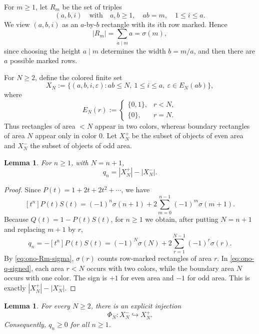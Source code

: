 \documentclass[11pt,reqno]{amsart}
\theoremstyle{plain}
\newtheorem{lemma}[theorem]{Lemma}
\theoremstyle{remark}
\theoremstyle{definition}
\numberwithin{equation}{section}
\newcommand{\auxftn}{P}
\newcommand{\auxprodftn}{Q}
\newcommand{\coefauxprod}{q}
\newcommand{\colorset}{E}
\newcommand{\rectangle}{R}
\begin{document}
For $m\ge1$, let $\rectangle _m$ be the set of triples
\[
  (a,b,i) \quad\text{with}\quad a,b\ge1,\quad ab=m,
  \quad 1\le i\le a.
\]
We view $(a,b,i)$ as an $a$-by-$b$ rectangle with its $i$th row marked. Hence
\begin{equation}\label{eq:ono-Rm-sigma}
  |\rectangle _m|=\sum_{a\mid m}a=\sigma(m),
\end{equation}
since choosing the height $a\mid m$ determines the width $b=m/a$, and then there are $a$ possible marked rows.

For $N\ge2$, define the colored finite set
\[
  X_N:=\{(a,b,i,\varepsilon): ab\le N,
      \ 1\le i\le a,
      \ \varepsilon\in \colorset _N(ab)\},
\]
where
\[
  \colorset _N(r):=
  \begin{cases}
    \{0,1\}, & r<N,\\
    \{0\},   & r=N.
  \end{cases}
\]
Thus rectangles of area $<N$ appear in two colors, whereas boundary rectangles of area $N$ appear only in color $0$. Let $X_N^+$ be the subset of objects of even area and $X_N^-$ the subset of objects of odd area.

\begin{lemma}\label{lem:ono-signedcount}
For $n\ge1$, with $N=n+1$,
\[
  \coefauxprod _n=|X_N^+|-|X_N^-|.
\]
\end{lemma}

\begin{proof}
Since $\auxftn (t)=1+2t+2t^2+\cdots$, we have
\[
  [t^n]\auxftn (t)S(t)
  =(-1)^n\sigma(n+1)+2\sum_{m=0}^{n-1}(-1)^m\sigma(m+1).
\]
Because $\auxprodftn (t)=1-\auxftn (t)S(t)$, for $n\ge1$ we obtain, after putting $N=n+1$ and replacing $m+1$ by $r$,
\begin{equation}\label{eq:ono-q-signed}
  \coefauxprod _n= -[t^n]\auxftn (t)S(t)
     =(-1)^N\sigma(N)+2\sum_{r=1}^{N-1}(-1)^r\sigma(r).
\end{equation}
By \eqref{eq:ono-Rm-sigma}, $\sigma(r)$ counts row-marked rectangles of area $r$. In \eqref{eq:ono-q-signed}, each area $r<N$ occurs with two colors, while the boundary area $N$ occurs with one color. The sign is $+1$ for even area and $-1$ for odd area. This is exactly $|X_N^+|-|X_N^-|$.
\end{proof}

\begin{lemma}\label{lem:ono-injection}
For every $N\ge2$, there is an explicit injection
\[
  \Phi_N:X_N^-\hookrightarrow X_N^+.
\]
Consequently, $\coefauxprod _n\ge0$ for all $n\ge1$.
\end{lemma}
\end{document}
